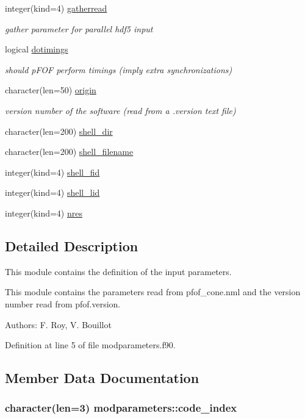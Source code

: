 \begin{DoxyCompactItemize}
integer(kind=4) \hyperlink{classmodparameters_a84036969384f84bc7f548da8e1a4fe56}{gatherread}
\begin{DoxyCompactList}\small\item\em gather parameter for parallel hdf5 input \end{DoxyCompactList}\item 
logical \hyperlink{classmodparameters_a3d21125b69403e3097f85434aa2bb08d}{dotimings}
\begin{DoxyCompactList}\small\item\em should p\-F\-O\-F perform timings (imply extra synchronizations) \end{DoxyCompactList}\item 
character(len=50) \hyperlink{classmodparameters_a912b8c25f0bccd646bbc63f8ecc2b052}{origin}
\begin{DoxyCompactList}\small\item\em version number of the software (read from a .version text file) \end{DoxyCompactList}\item 
character(len=200) \hyperlink{classmodparameters_adb57a3540b1d0caa308f50ac8f56d99f}{shell\-\_\-dir}
\item 
character(len=200) \hyperlink{classmodparameters_a308c50059015f7278785da01f4a9f99b}{shell\-\_\-filename}
\item 
integer(kind=4) \hyperlink{classmodparameters_ab8116a893043284dd7f4c7d54d179af6}{shell\-\_\-fid}
\item 
integer(kind=4) \hyperlink{classmodparameters_a669111d8b0ac2247e89f14c8778d77d5}{shell\-\_\-lid}
\item 
integer(kind=4) \hyperlink{classmodparameters_af1cb485d0a4ab3c8e0c54b81973aff9a}{nres}
\end{DoxyCompactItemize}


\subsection{Detailed Description}
This module contains the definition of the input parameters. 

This module contains the parameters read from pfof\-\_\-cone.\-nml and the version number read from pfof.\-version.

Authors\-: F. Roy, V. Bouillot 

Definition at line 5 of file modparameters.\-f90.



\subsection{Member Data Documentation}
\hypertarget{classmodparameters_ac0cde1e01b079fda34684162c34a2ac9}{
\subsubsection[{code\-\_\-index}]{\setlength{\rightskip}{0pt plus 5cm}character(len=3) modparameters\-::code\-\_\-index}}\label{classmodparameters_ac0cde1e01b079fda34684162c34a2ac9}


